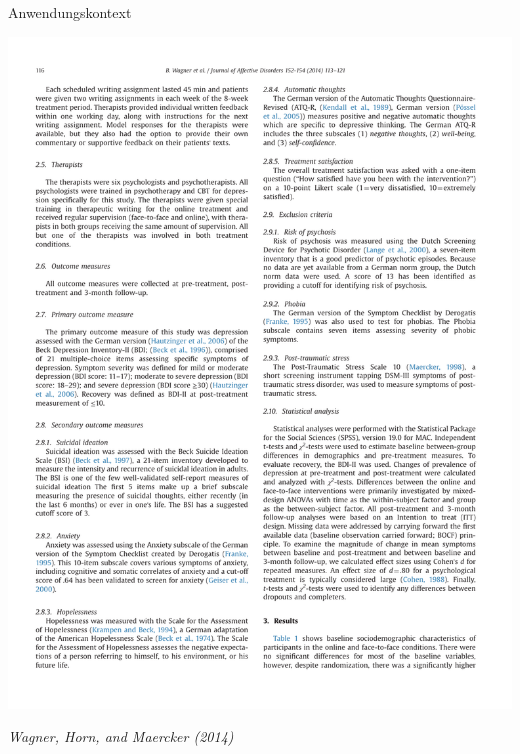 \documentclass[
  8pt,
  ignorenonframetext,
]{beamer}
\begin{document}
\begin{frame}[t]{Anwendungskontext}
\begin{center}\includegraphics[width=0.3\linewidth]{8_Abbildungen/alm_8_article_intervention_3} \end{center}
\flushright
\footnotesize

\emph{Wagner, Horn, and Maercker (2014)}
\end{frame}
\end{document}
